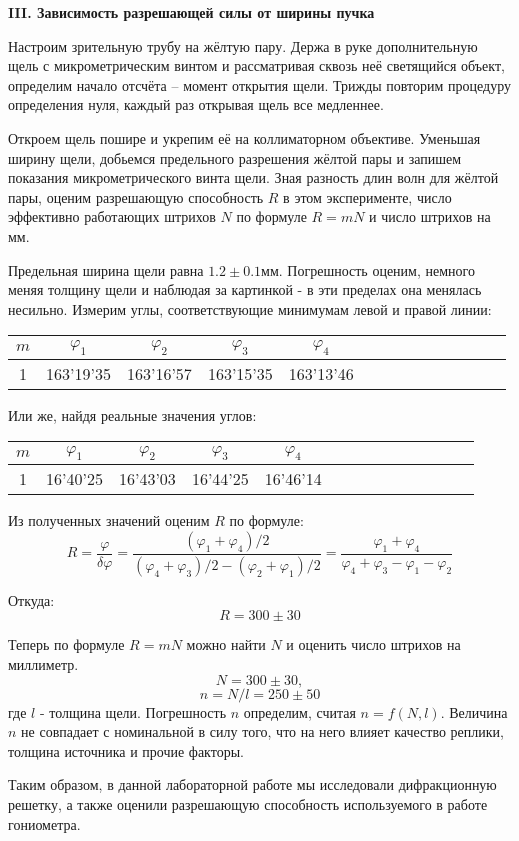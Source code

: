 \documentclass[14pt]{article}
\begin{document}
\vspace{1cm}
\textbf{III. Зависимость разрешающей силы от ширины пучка}

Настроим зрительную трубу на жёлтую пару. Держа в руке дополнительную щель с микрометрическим винтом и рассматривая сквозь неё светящийся объект, определим начало отсчёта -- момент открытия щели. Трижды повторим процедуру определения нуля, каждый раз открывая щель все медленнее.

Откроем щель пошире и укрепим её на коллиматорном объективе. Уменьшая ширину щели, добьемся предельного разрешения жёлтой пары и запишем показания микрометрического винта щели. Зная разность длин волн для жёлтой пары, оценим разрешающую способность $R$ в этом эксперименте, число эффективно работающих штрихов $N$ по формуле $R = mN$ и число штрихов на мм.

Предельная ширина щели равна $1.2\pm0.1$мм. Погрешность оценим, немного меняя толщину щели и наблюдая за картинкой - в эти пределах она менялась несильно. Измерим углы, соответствующие минимумам левой и правой линии:

\begin{center}
\begin{tabular}{|c|c|c|c|c|c|c|c|c|c|c|c|c|c|}
\hline
$m$	&	$\varphi_1$	&	$\varphi_2$	&	$\varphi_3$	&	$\varphi_4$	\\
\hline
1	&	163'19'35	&	163'16'57	&	163'15'35	&	163'13'46	\\
\hline
\end{tabular}
\end{center}

Или же, найдя реальные значения углов:

\begin{center}
\begin{tabular}{|c|c|c|c|c|c|c|c|c|c|c|c|c|c|}
\hline
$m$	&	$\varphi_1$	&	$\varphi_2$	&	$\varphi_3$	&	$\varphi_4$	\\
\hline
1	&	16'40'25	&	16'43'03	&	16'44'25	&	16'46'14	\\
\hline
\end{tabular}
\end{center}

Из полученных значений оценим $R$ по формуле:
$$
	R = \frac{\varphi}{\delta\varphi} = \frac{(\varphi_1 + \varphi_4)/2}{(\varphi_4+\varphi_3)/2 - (\varphi_2+\varphi_1)/2} = 
	    \frac{\varphi_1 + \varphi_4}{\varphi_4+\varphi_3 - \varphi_1-\varphi_2}
$$

Откуда:
$$
	R = 300 \pm 30
$$

Теперь по формуле $R = mN$ можно найти $N$ и оценить число штрихов на миллиметр.
$$
	N = 300 \pm 30,
$$
$$
	n = N/l = 250 \pm 50
$$
\noindent где $l$ - толщина щели. Погрешность $n$ определим, считая $n = f(N, l)$. Величина $n$ не совпадает с номинальной в силу того, что на него влияет качество реплики, толщина источника и прочие факторы.

\newpage
Таким образом, в данной лабораторной работе мы исследовали дифракционную решетку, а также оценили разрешающую способность используемого в работе гониометра.
\end{document}

